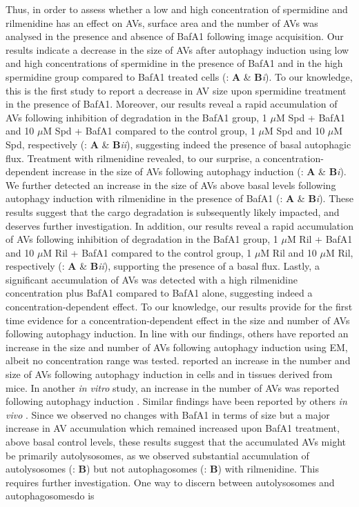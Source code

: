 Thus, in order to assess whether a low and high concentration of spermidine and rilmenidine has an effect on AVs, surface area and the number of AVs was analysed in the presence and absence of BafA1 following image acquisition. Our results indicate a decrease in the size of AVs after autophagy induction using low and high concentrations of spermidine in the presence of BafA1 and in the high spermidine group compared to BafA1 treated cells (: \textbf{A} \& \textbf{B}\textit{i}). To our knowledge, this is the first study to report a decrease in AV size upon spermidine treatment in the presence of BafA1. Moreover, our results reveal a rapid accumulation of AVs following inhibition of degradation in the BafA1 group, 1 $\mu$M Spd + BafA1 and 10 $\mu$M Spd + BafA1 compared to the control group, 1 $\mu$M Spd and 10 $\mu$M Spd, respectively  (: \textbf{A} \& \textbf{B}\textit{ii}), suggesting indeed the presence of basal autophagic flux.  Treatment with rilmenidine revealed, to our surprise, a concentration-dependent increase in the size of AVs following autophagy induction (: \textbf{A} \& \textbf{B}\textit{i}). We further detected an increase in the size of AVs above basal levels following autophagy induction with rilmenidine in the presence of BafA1 (: \textbf{A} \& \textbf{B}\textit{i}). These results suggest that the cargo degradation is subsequently likely impacted, and deserves further investigation. In addition, our results reveal a rapid accumulation of AVs following inhibition of degradation in the BafA1 group, 1 $\mu$M Ril + BafA1 and 10 $\mu$M Ril + BafA1 compared to the control group, 1 $\mu$M Ril and 10 $\mu$M Ril, respectively (: \textbf{A} \& \textbf{B}\textit{ii}), supporting the presence of a basal flux. Lastly, a significant accumulation of AVs was detected with a high rilmenidine concentration plus BafA1 compared to BafA1 alone, suggesting indeed a concentration-dependent effect.  To our knowledge, our results provide for the first time evidence for a concentration-dependent effect in the size and number of AVs following autophagy induction.  In line with our findings, others have reported an increase in the size and number of AVs following autophagy induction using EM, albeit no concentration range was tested. \citet{Mizushima2004a} reported an increase in the number and size of AVs following autophagy induction in cells and in tissues derived from mice. In another \textit{in vitro} study, an increase in the number of AVs was reported  following autophagy induction \citep{Lum2005}. Similar findings have been reported by others \textit{in vivo} \citep{Alirezaei2010,Ericsson1969,Mizushima2004a}. Since we observed no changes with BafA1 in terms of size but a major increase in AV accumulation which remained increased upon BafA1 treatment, above basal control levels, these results suggest that the accumulated AVs might be primarily autolysosomes, as we observed substantial accumulation of autolysosomes (: \textbf{B}) but not autophagosomes (: \textbf{B}) with rilmenidine. This requires further investigation. One way to discern between autolysosomes and autophagosomesdo is 
